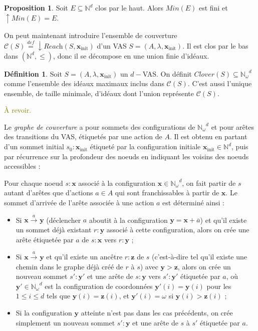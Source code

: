 \documentclass[a4paper,final]{article}
\theoremstyle{definition}
\newtheorem{Definition}[Theorem]{Définition}
\newtheorem{Proposition}[Theorem]{Proposition}
\let\leq\leqslant
\newcommand{\alain}[1]{\textcolor{blue}{#1}}
\newcommand{\lucas}[1]{\textcolor{olive}{#1}}
\newcommand{\defeq}{\ensuremath{\stackrel{\textit{def}}{=}}}
\newcommand{\Min}{\textit{Min}}
\newcommand{\N}{\ensuremath{\mathbb{N}}}
\newcommand{\Nomega}{\ensuremath{\mathbb{N}_\omega}}
\newcommand{\reach}{\ensuremath{\textit{Reach}}}
\newcommand{\cover}{\ensuremath{\mathcal{C}}}
\newcommand{\clover}{\textit{Clover}}
\newcommand{\trans}[2]{\ensuremath{\stackrel{#1}{\longrightarrow}_{#2}}}
\newcommand{\vect}[1]{\ensuremath{\mathbf{#1}}}
\newcommand{\xinit}{\ensuremath{\vect{x}_\text{init}}}
\newcommand{\valeur}[1]{\ensuremath{\overline{#1}}}
\begin{document}
\begin{Proposition}%
\label{clos_haut_wqo}
Soit $E\subseteq \N^d$ clos par le haut.
Alors $\Min(E)$ est fini et $\uparrow \Min(E) = E$.
\end{Proposition}

On peut maintenant introduire l'ensemble de couverture $\cover(S) \defeq \downarrow \reach(S,\xinit)$ d'un VAS $S = (A,\lambda,\xinit)$.
Il est clos par le bas dans $(\N^d,\leq)$, donc il se décompose en une union finie d'idéaux.


\begin{Definition}
Soit $S=(A,\lambda,\xinit)$ un $d-$VAS.
On définit $\clover(S) \subseteq \Nomega^d$ comme l'ensemble des idéaux maximaux inclus dans $\cover(S)$.
C'est aussi l'unique ensemble, de taille minimale, d'idéaux dont l'union représente $\cover(S)$.
\end{Definition}


\lucas{À revoir.}

Le \emph{graphe de couverture} a pour sommets des configurations de $\Nomega^d$ et pour arêtes des transitions du VAS, étiquetés par une action de $A$.
Il est obtenu en partant d'un sommet initial $s_0:\xinit$ étiqueté par la configuration initiale $\xinit\in \N^d$, puis par récurrence sur la profondeur des noeuds en indiquant les voisins des noeuds accessibles :

Pour chaque noeud $s:\vect{x}$ associé à la configuration $\vect{x}\in \Nomega^d$, on fait partir de $s$ autant d'arêtes que d'actions $a\in A$ qui sont franchissables à partir de $\vect{x}$.
Le sommet d'arrivée de l'arête associée à une action $a$ est déterminé ainsi :
\begin{itemize}
    \item Si $\vect{x}\trans{a}{} \vect{y}$ (déclencher $a$ aboutit à la configuration $\vect{y} = \vect{x} + \valeur{a}$) 
    et qu'il existe un sommet déjà existant $r:\vect{y}$ associé à cette configuration, alors on crée une arête étiquetée par $a$ de $s:\vect{x}$ vers $r:\vect{y}$ ;
    \item Si $\vect{x}\trans{a}{} \vect{y}$ et qu'il existe un ancêtre $r:\vect{z}$ de $s$ (c'est-à-dire tel qu'il existe une chemin dans le graphe déjà créé de $r$ à $s$) avec $\vect{y}>\vect{z}$, 
    alors on crée un nouveau sommet $s':\vect{y'}$ et une arête de $s:\vect{y}$ vers $s':\vect{y'}$ étiquetée par $a$, 
    où $\vect{y'}\in \Nomega^d$ est la configuration de coordonnées $\vect{y'}(i) = \vect{y}(i)$ pour les $1\leq i\leq d$ tels que $\vect{y}(i)=\vect{z}(i)$, et $\vect{y'}(i) = \omega$ si $\vect{y}(i)>\vect{z}(i)$ ;
    \item Si la configuration $\vect{y}$ atteinte n'est pas dans les cas précédents, on crée simplement un nouveau sommet $s':\vect{y}$ et une arête de $s$ à $s'$ étiquetée par $a$.
\end{itemize}
\end{document}
